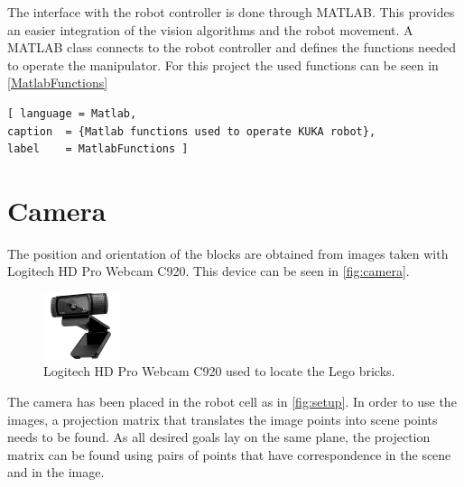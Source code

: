 The interface with the robot controller is done through MATLAB. This provides an easier integration of the vision algorithms and the robot movement. A MATLAB class connects to the robot controller and defines the functions needed to operate the manipulator. For this project the used functions can be seen in \autoref{MatlabFunctions}
\begin{lstlisting}[ language = Matlab,
caption  = {Matlab functions used to operate KUKA robot},
label    = MatlabFunctions ]

\end{lstlisting}

\section{Camera}
The position and orientation of the blocks are obtained from images taken with Logitech HD Pro Webcam C920. This device can be seen in \autoref{fig:camera}.
\begin{figure}[H]
    \includegraphics[width=0.2\textwidth]{figures/camera.png}
    \caption{Logitech HD Pro Webcam C920 used to locate the Lego bricks.\cite{camera} }
    \label{fig:camera}
\end{figure}
The camera has been placed in the robot cell as in \autoref{fig:setup}. In order to use the images, a projection matrix that translates the image points into scene points needs to be found. As all desired goals lay on the same plane, the projection matrix can be found using pairs of points that have correspondence in the scene and in the image.

